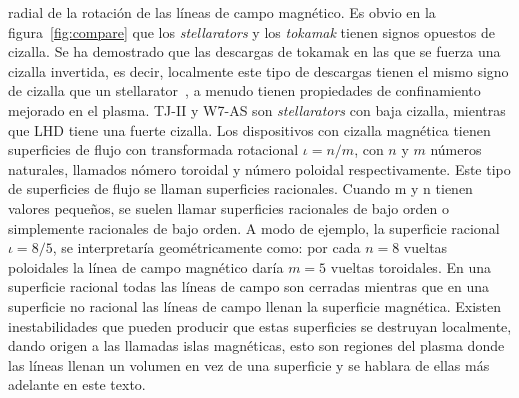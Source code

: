 radial de la rotación de las líneas de campo magnético. Es obvio en la figura~\ref{fig:compare} que los \textit{stellarators} y los \textit{tokamak} tienen signos opuestos de cizalla. Se
ha demostrado que las descargas de tokamak en las que se fuerza una cizalla
invertida, es decir, localmente este tipo de descargas tienen el mismo signo
de cizalla que un stellarator~\cite{PhysRevLett.75.4417}, a menudo tienen propiedades
de confinamiento mejorado en el plasma. TJ-II y W7-AS son \textit{stellarators}
con baja cizalla, mientras que LHD tiene una fuerte cizalla. Los
dispositivos con cizalla magnética tienen superficies de flujo con transformada
rotacional $\iota=n/m$, con $n$ y $m$ números naturales, llamados nómero toroidal
y número poloidal respectivamente. Este tipo de superficies de flujo se llaman
superficies racionales. Cuando m y n tienen valores pequeños, se
suelen llamar superficies racionales de bajo orden o simplemente racionales
de bajo orden. A modo de ejemplo, la superficie racional $\iota=8/5$,
se interpretaría geométricamente como: por cada $n=8$ vueltas poloidales la
línea de campo magnético daría $m=5$ vueltas toroidales. En una superficie
racional todas las líneas de campo son cerradas mientras que en una superficie
no racional las líneas de campo llenan la superficie magnética.
Existen inestabilidades que pueden producir que estas superficies
se destruyan localmente, dando origen a las llamadas islas magnéticas, esto son regiones del plasma donde las líneas llenan un volumen en vez de una
superficie y se hablara de ellas más adelante en este texto.
